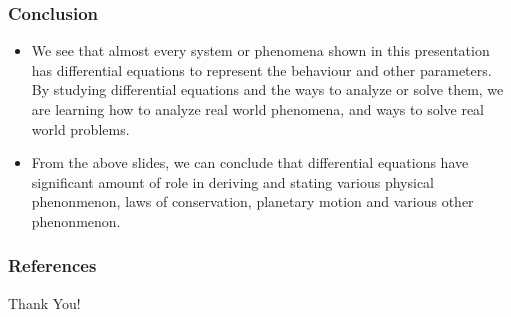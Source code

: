 \documentclass[10pt]{beamer}
\begin{document}
\begin{frame}
    \frametitle{Conclusion}
    \begin{itemize}
        \item We see that almost every system or phenomena shown in this presentation has differential equations to represent the behaviour and other parameters. By studying differential equations and the ways to analyze or solve them, we are learning how to analyze real world phenomena, and ways to solve real world problems.
        \item From the above slides, we can conclude that differential equations have significant amount of role in deriving and stating various physical phenonmenon, laws of conservation, planetary motion and various other phenonmenon.
    \end{itemize}
\end{frame}


\begin{frame}
    \fontsize{8pt}{9pt}\selectfont
    \frametitle{References}
    \printbibliography
\end{frame}

\begin{frame}
    \begin{center}
        \huge Thank You!
    \end{center}
\end{frame}
\end{document}
